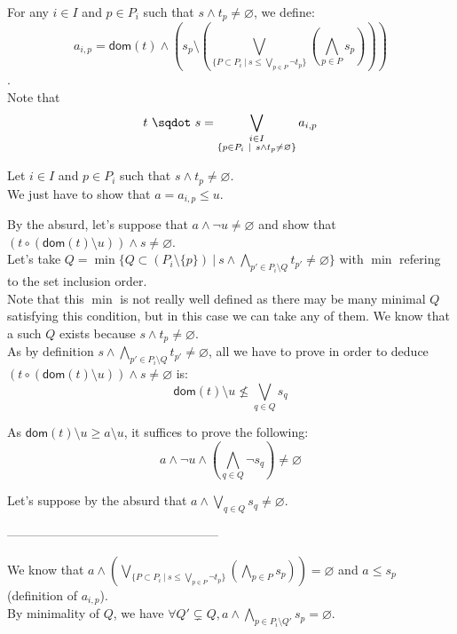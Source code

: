 \documentclass[a4paper]{article}%
\newcommand{\worra}[2]{#1\mathop{\,\sqdot\,} #2}
\newcommand{\apply}[2]{#1\circ#2}
\newcommand{\dom}[1]{\textsf{dom}(#1)}
\newcommand{\alt}{~|~}
\begin{document}
    For any $i \in I$ and $p \in P_i$ such that $s \land t_p \neq \varnothing$, we define:
    \[a_{i,p}=\dom t \land \left(s_p \setminus \left(\bigvee_{\{P \subset P_i\alt s \leq \bigvee_{p \in P} \neg t_p\}} \left(\bigwedge_{p \in P} s_p\right) \right)\right)\].\\
    Note that \[\worra t s = \bigvee_{\substack{i \in I\\ \{p \in P_i \alt s \land t_p \neq \varnothing\}}} a_{i,p} \]

    Let $i \in I$ and $p \in P_i$ such that $s \land t_p \neq \varnothing$.\\
    We just have to show that $a = a_{i,p} \leq u$.

    By the absurd, let's suppose that $a \land \neg u \neq \varnothing$ and show that $(\apply t {(\dom t \setminus u)}) \land s \neq \varnothing$.\\

    Let's take $Q = \min \{ Q \subset (P_i \setminus \{p\}) \alt s \land \bigwedge_{p' \in P_i\setminus Q} t_{p'} \neq \varnothing \}$ with $\min$ refering to the set inclusion order.\\
    Note that this $\min$ is not really well defined as there may be many minimal $Q$ satisfying this condition, but in this case we can take any of them.     We know that a such $Q$ exists because $s \land t_p \neq \varnothing$.\\

    As by definition $s \land \bigwedge_{p'\in P_i\setminus Q}t_{p'} \neq \varnothing$, all we have to prove in order to deduce $(\apply t {(\dom t \setminus u)}) \land s \neq \varnothing$ is:\\
    \[ \dom t \setminus u \not\leq \bigvee_{q\in Q}s_q \]

    As $ \dom t \setminus u \geq a \setminus u$, it suffices to prove the following:
    \[ a \land \neg u \land (\bigwedge_{q\in Q} \neg s_q) \neq \varnothing \]

    Let's suppose by the absurd that $a \land \bigvee_{q\in Q} s_q \neq \varnothing$.

    ---------------------------------------------------

    We know that $a \land \left(\bigvee_{\{P \subset P_i\alt s \leq \bigvee_{p \in P} \neg t_p\}} \left(\bigwedge_{p \in P} s_p\right) \right) = \varnothing$ and $a \leq s_p$ (definition of $a_{i,p}$).\\
    By minimality of $Q$, we have $\forall Q' \subsetneq Q, a \land \bigwedge_{p \in P_i\setminus Q'} s_p = \varnothing$.\\
\end{document}
